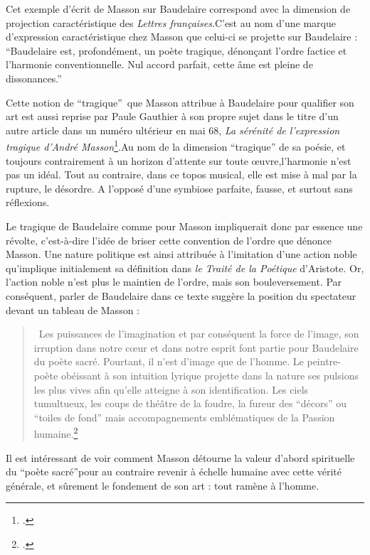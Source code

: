 	Cet exemple d'écrit de Masson sur Baudelaire correspond avec la dimension de projection caractéristique des \emph{Lettres françaises}.C’est au nom d’une marque d’expression caractéristique chez Masson que celui-ci se projette sur Baudelaire : \enquote{Baudelaire est, profondément, un poète tragique, dénonçant l’ordre factice et l’harmonie conventionnelle. Nul accord parfait, cette âme est pleine de dissonances.} 

Cette notion de \enquote{tragique} que Masson attribue à Baudelaire pour qualifier son art est aussi reprise par Paule Gauthier à son propre sujet dans le titre d’un autre article dans un numéro ultérieur en mai 68, \emph{La sérénité de l’expression tragique d’André Masson}\footcite{expressiontragique}.Au nom de la dimension \enquote{tragique} de sa poésie, et toujours contrairement à un horizon d’attente sur toute \oe{}uvre,l’harmonie n’est pas un idéal. Tout au contraire, dans ce topos musical, elle est mise à mal par la rupture, le désordre. A l’opposé d’une symbiose parfaite, fausse, et surtout sans réflexions. 


	
 Le tragique de Baudelaire comme pour Masson impliquerait donc par essence une révolte, c’est-à-dire l’idée de briser cette convention de l’ordre que dénonce Masson. Une nature politique est ainsi attribuée à l’imitation d’une action noble qu’implique initialement sa définition dans \emph{le Traité de la Poétique} d’Aristote. Or, l’action noble n’est plus le maintien de l’ordre, mais son bouleversement. Par conséquent, parler de Baudelaire dans ce texte suggère la position du spectateur devant un tableau de Masson : 

\begin{quote}
 Les puissances de l’imagination et par conséquent la force de l’image, son irruption dans notre c\oe{}ur et dans notre esprit font partie pour Baudelaire du poète sacré. Pourtant, il n’est d’image que de l’homme. Le peintre-poète obéissant à son intuition lyrique projette dans la nature ses pulsions les plus vives afin qu’elle atteigne à son identification. Les ciels tumultueux, les coups de théâtre de la foudre, la fureur des \enquote{décors} ou \enquote{toiles de fond} mais accompagnements emblématiques de la Passion humaine.\footcite{baudelairepeintres}\end{quote}
 
 Il est intéressant de voir comment Masson détourne la valeur d’abord spirituelle du \enquote{poète sacré}pour au contraire revenir à échelle humaine avec cette vérité générale, et sûrement le fondement de son art : tout ramène à l’homme. 

